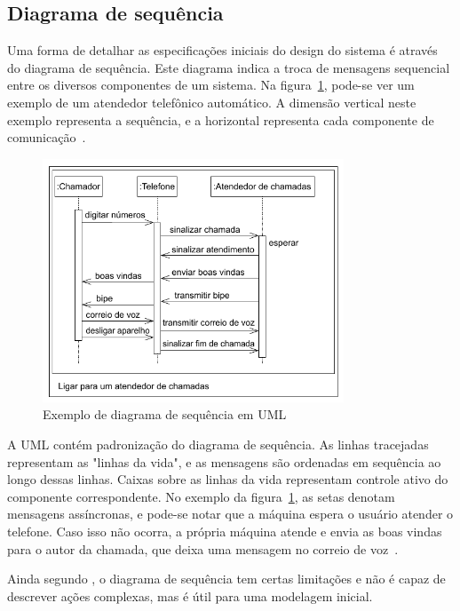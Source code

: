 \subsection{Diagrama de sequência}
Uma forma de detalhar as especificações iniciais do design do sistema é através do diagrama de sequência. Este diagrama indica a troca de mensagens sequencial entre os diversos componentes de um sistema. Na figura~\ref{fig:seq_chart}, pode-se ver um exemplo de um atendedor telefônico automático. A dimensão vertical neste exemplo representa a sequência, e a horizontal representa cada componente de comunicação~\cite{marwedel:2010}.

\begin{figure}[!ht]
	\caption{\label{fig:seq_chart}Exemplo de diagrama de sequência em UML}
	\begin{center}
	    \includegraphics[width=0.8\textwidth]{resources/seq_chart_marwedel_1}
	\end{center}
\end{figure}

A UML contém padronização do diagrama de sequência. As linhas tracejadas representam as "linhas da vida", e as mensagens são ordenadas em sequência ao longo dessas linhas. Caixas sobre as linhas da vida representam controle ativo do componente correspondente. No exemplo da figura~\ref{fig:seq_chart}, as setas denotam mensagens assíncronas, e pode-se notar que a máquina espera o usuário atender o telefone. Caso isso não ocorra, a própria máquina atende e envia as boas vindas para o autor da chamada, que deixa uma mensagem no correio de voz~\cite{marwedel:2010}.

Ainda segundo , o diagrama de sequência tem certas limitações e não é capaz de descrever ações complexas, mas é útil para uma modelagem inicial.

